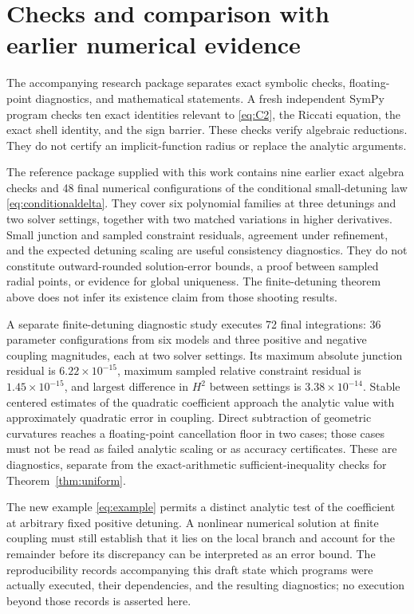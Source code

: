 \documentclass[11pt]{article}
\begin{document}
\section{Checks and comparison with earlier numerical evidence}
The accompanying research package separates exact symbolic checks, floating-point diagnostics, and mathematical statements. A fresh independent SymPy program checks ten exact identities relevant to \eqref{eq:C2}, the Riccati equation, the exact shell identity, and the sign barrier. These checks verify algebraic reductions. They do not certify an implicit-function radius or replace the analytic arguments.

The reference package supplied with this work contains nine earlier exact algebra checks and 48 final numerical configurations of the conditional small-detuning law \eqref{eq:conditionaldelta}. They cover six polynomial families at three detunings and two solver settings, together with two matched variations in higher derivatives. Small junction and sampled constraint residuals, agreement under refinement, and the expected detuning scaling are useful consistency diagnostics. They do not constitute outward-rounded solution-error bounds, a proof between sampled radial points, or evidence for global uniqueness. The finite-detuning theorem above does not infer its existence claim from those shooting results.

A separate finite-detuning diagnostic study executes 72 final integrations: 36 parameter configurations from six models and three positive and negative coupling magnitudes, each at two solver settings. Its maximum absolute junction residual is $6.22\times10^{-15}$, maximum sampled relative constraint residual is $1.45\times10^{-15}$, and largest difference in $H^2$ between settings is $3.38\times10^{-14}$. Stable centered estimates of the quadratic coefficient approach the analytic value with approximately quadratic error in coupling. Direct subtraction of geometric curvatures reaches a floating-point cancellation floor in two cases; those cases must not be read as failed analytic scaling or as accuracy certificates. These are diagnostics, separate from the exact-arithmetic sufficient-inequality checks for Theorem~\ref{thm:uniform}.

The new example \eqref{eq:example} permits a distinct analytic test of the coefficient at arbitrary fixed positive detuning. A nonlinear numerical solution at finite coupling must still establish that it lies on the local branch and account for the remainder before its discrepancy can be interpreted as an error bound. The reproducibility records accompanying this draft state which programs were actually executed, their dependencies, and the resulting diagnostics; no execution beyond those records is asserted here.
\end{document}
